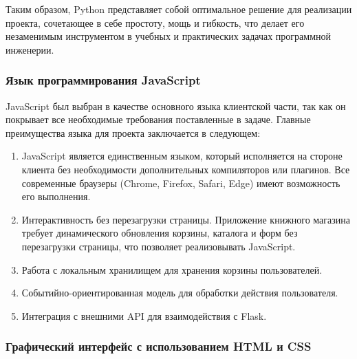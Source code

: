 Таким образом, Python представляет собой оптимальное решение для реализации проекта, сочетающее в себе простоту, мощь и гибкость, что делает его незаменимым инструментом в учебных и практических задачах программной инженерии.

\subsubsection{Язык программирования JavaScript}

JavaScript был выбран в качестве основного языка клиентской части, так как он покрывает все необходимые требования поставленные в задаче. Главные преимущества языка для проекта заключается в следующем:
 
\begin{enumerate}
	\item JavaScript является единственным языком, который исполняется на стороне клиента без необходимости дополнительных компиляторов или плагинов. Все современные браузеры (Chrome, Firefox, Safari, Edge) имеют возможность его выполнения.
	\item Интерактивность без перезагрузки страницы. Приложение книжного магазина требует динамического обновления корзины, каталога и форм без перезагрузки страницы, что позволяет реализовывать JavaScript.
	\item Работа с локальным хранилищем для хранения корзины пользователей.
	\item Событийно-ориентированная модель для обработки действия пользователя.
	\item Интеграция с внешними API для взаимодействия с Flask.
\end{enumerate}

\subsubsection{Графический интерфейс с использованием HTML и CSS}

